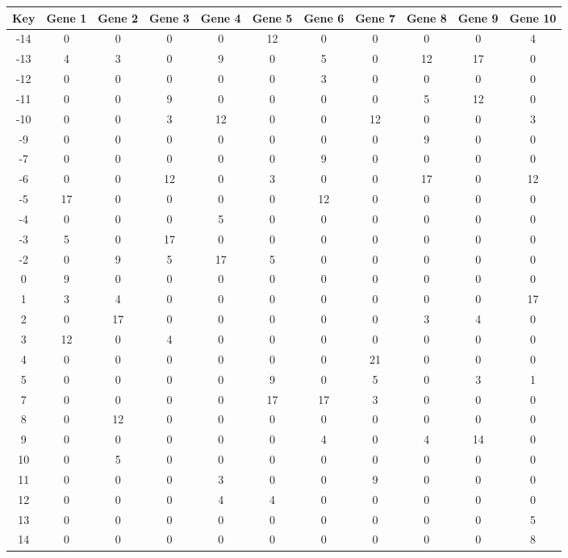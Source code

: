 \begin{tabular}{|c|c|c|c|c|c|c|c|c|c|c|}
\hline
Key & Gene 1 & Gene 2 & Gene 3 & Gene 4 & Gene 5 & Gene 6 & Gene 7 & Gene 8 & Gene 9 & Gene 10 \\
\hline
-14 & 0 & 0 & 0 & 0 & 12 & 0 & 0 & 0 & 0 & 4 \\
-13 & 4 & 3 & 0 & 9 & 0 & 5 & 0 & 12 & 17 & 0 \\
-12 & 0 & 0 & 0 & 0 & 0 & 3 & 0 & 0 & 0 & 0 \\
-11 & 0 & 0 & 9 & 0 & 0 & 0 & 0 & 5 & 12 & 0 \\
-10 & 0 & 0 & 3 & 12 & 0 & 0 & 12 & 0 & 0 & 3 \\
-9 & 0 & 0 & 0 & 0 & 0 & 0 & 0 & 9 & 0 & 0 \\
-7 & 0 & 0 & 0 & 0 & 0 & 9 & 0 & 0 & 0 & 0 \\
-6 & 0 & 0 & 12 & 0 & 3 & 0 & 0 & 17 & 0 & 12 \\
-5 & 17 & 0 & 0 & 0 & 0 & 12 & 0 & 0 & 0 & 0 \\
-4 & 0 & 0 & 0 & 5 & 0 & 0 & 0 & 0 & 0 & 0 \\
-3 & 5 & 0 & 17 & 0 & 0 & 0 & 0 & 0 & 0 & 0 \\
-2 & 0 & 9 & 5 & 17 & 5 & 0 & 0 & 0 & 0 & 0 \\
0 & 9 & 0 & 0 & 0 & 0 & 0 & 0 & 0 & 0 & 0 \\
1 & 3 & 4 & 0 & 0 & 0 & 0 & 0 & 0 & 0 & 17 \\
2 & 0 & 17 & 0 & 0 & 0 & 0 & 0 & 3 & 4 & 0 \\
3 & 12 & 0 & 4 & 0 & 0 & 0 & 0 & 0 & 0 & 0 \\
4 & 0 & 0 & 0 & 0 & 0 & 0 & 21 & 0 & 0 & 0 \\
5 & 0 & 0 & 0 & 0 & 9 & 0 & 5 & 0 & 3 & 1 \\
7 & 0 & 0 & 0 & 0 & 17 & 17 & 3 & 0 & 0 & 0 \\
8 & 0 & 12 & 0 & 0 & 0 & 0 & 0 & 0 & 0 & 0 \\
9 & 0 & 0 & 0 & 0 & 0 & 4 & 0 & 4 & 14 & 0 \\
10 & 0 & 5 & 0 & 0 & 0 & 0 & 0 & 0 & 0 & 0 \\
11 & 0 & 0 & 0 & 3 & 0 & 0 & 9 & 0 & 0 & 0 \\
12 & 0 & 0 & 0 & 4 & 4 & 0 & 0 & 0 & 0 & 0 \\
13 & 0 & 0 & 0 & 0 & 0 & 0 & 0 & 0 & 0 & 5 \\
14 & 0 & 0 & 0 & 0 & 0 & 0 & 0 & 0 & 0 & 8 \\
\hline
\end{tabular}